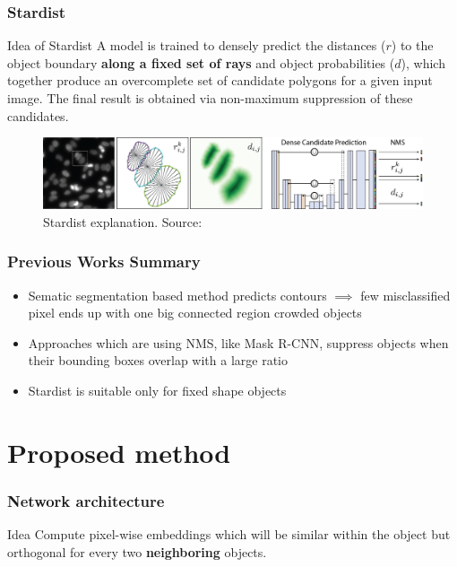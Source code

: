 \documentclass{beamer}
\begin{document}
\begin{frame}
    \frametitle{Stardist}

    \begin{block}{Idea of Stardist}
        A model is trained to densely predict the distances ($r$)
        to the object boundary \textbf{along a fixed set of rays} and object
        probabilities ($d$), which together produce an
        overcomplete set of candidate polygons for a given
        input image. The final result is obtained via
        non-maximum suppression of these candidates.
    \end{block}

    \begin{figure}[h]
        \includegraphics[width=\textwidth]{stardist.png}
        \caption{Stardist explanation. Source: \cite{schmidt2018}}
    \end{figure}

\end{frame}

\begin{frame}
    \frametitle{Previous Works Summary}

    \begin{itemize}[<+->]
        \item Sematic segmentation based method predicts contours $\implies$
              few misclassified pixel ends up with one big connected region crowded objects
        \item Approaches which are using NMS, like Mask R-CNN, suppress objects when their bounding boxes
              overlap with a large ratio
        \item Stardist is suitable only for fixed shape objects
    \end{itemize}

\end{frame}

\section{Proposed method}

\begin{frame}
    \frametitle{Network architecture}

    \begin{block}{Idea}
        Compute pixel-wise embeddings which will be similar within the
        object but orthogonal for every two \textbf{neighboring} objects.
    \end{block}

\end{frame}
\end{document}
